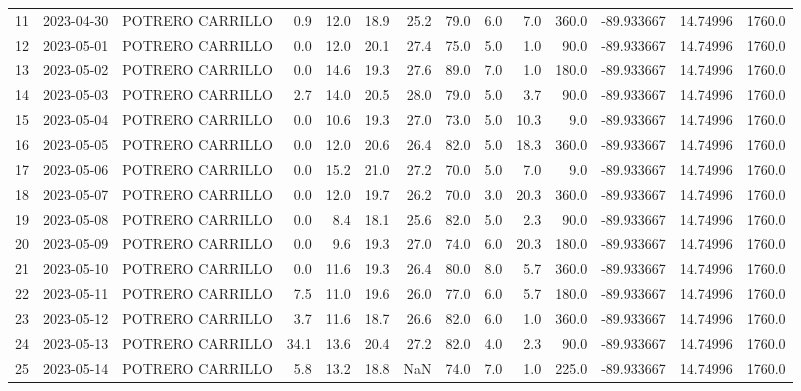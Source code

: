 \documentclass[12pt]{article}
\begin{document}
\begin{center}
\begin{tabular}{lllrrrrrrrrrrr}
11  & 2023-04-30 &  POTRERO CARRILLO &     0.9 &  12.0 &   18.9 &  25.2 &     79.0 &  6.0 &         7.0 &       360.0 & -89.933667 &  14.74996 &   1760.0 \\
12  & 2023-05-01 &  POTRERO CARRILLO &     0.0 &  12.0 &   20.1 &  27.4 &     75.0 &  5.0 &         1.0 &        90.0 & -89.933667 &  14.74996 &   1760.0 \\
13  & 2023-05-02 &  POTRERO CARRILLO &     0.0 &  14.6 &   19.3 &  27.6 &     89.0 &  7.0 &         1.0 &       180.0 & -89.933667 &  14.74996 &   1760.0 \\
14  & 2023-05-03 &  POTRERO CARRILLO &     2.7 &  14.0 &   20.5 &  28.0 &     79.0 &  5.0 &         3.7 &        90.0 & -89.933667 &  14.74996 &   1760.0 \\
15  & 2023-05-04 &  POTRERO CARRILLO &     0.0 &  10.6 &   19.3 &  27.0 &     73.0 &  5.0 &        10.3 &         9.0 & -89.933667 &  14.74996 &   1760.0 \\
16  & 2023-05-05 &  POTRERO CARRILLO &     0.0 &  12.0 &   20.6 &  26.4 &     82.0 &  5.0 &        18.3 &       360.0 & -89.933667 &  14.74996 &   1760.0 \\
17  & 2023-05-06 &  POTRERO CARRILLO &     0.0 &  15.2 &   21.0 &  27.2 &     70.0 &  5.0 &         7.0 &         9.0 & -89.933667 &  14.74996 &   1760.0 \\
18  & 2023-05-07 &  POTRERO CARRILLO &     0.0 &  12.0 &   19.7 &  26.2 &     70.0 &  3.0 &        20.3 &       360.0 & -89.933667 &  14.74996 &   1760.0 \\
19  & 2023-05-08 &  POTRERO CARRILLO &     0.0 &   8.4 &   18.1 &  25.6 &     82.0 &  5.0 &         2.3 &        90.0 & -89.933667 &  14.74996 &   1760.0 \\
20  & 2023-05-09 &  POTRERO CARRILLO &     0.0 &   9.6 &   19.3 &  27.0 &     74.0 &  6.0 &        20.3 &       180.0 & -89.933667 &  14.74996 &   1760.0 \\
21  & 2023-05-10 &  POTRERO CARRILLO &     0.0 &  11.6 &   19.3 &  26.4 &     80.0 &  8.0 &         5.7 &       360.0 & -89.933667 &  14.74996 &   1760.0 \\
22  & 2023-05-11 &  POTRERO CARRILLO &     7.5 &  11.0 &   19.6 &  26.0 &     77.0 &  6.0 &         5.7 &       180.0 & -89.933667 &  14.74996 &   1760.0 \\
23  & 2023-05-12 &  POTRERO CARRILLO &     3.7 &  11.6 &   18.7 &  26.6 &     82.0 &  6.0 &         1.0 &       360.0 & -89.933667 &  14.74996 &   1760.0 \\
24  & 2023-05-13 &  POTRERO CARRILLO &    34.1 &  13.6 &   20.4 &  27.2 &     82.0 &  4.0 &         2.3 &        90.0 & -89.933667 &  14.74996 &   1760.0 \\
25  & 2023-05-14 &  POTRERO CARRILLO &     5.8 &  13.2 &   18.8 &   NaN &     74.0 &  7.0 &         1.0 &       225.0 & -89.933667 &  14.74996 &   1760.0 \\
\bottomrule
\end{tabular}

        
        \end{center}
        
\end{document}
